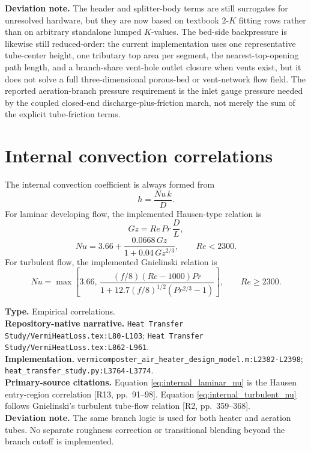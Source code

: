 \documentclass[11pt]{article}
\newcommand{\srcref}[1]{\nolinkurl{#1}}
\newcommand{\filepath}[1]{\nolinkurl{#1}}
\begin{document}
\textbf{Deviation note.} The header and splitter-body terms are still surrogates for unresolved hardware, but they are now based on textbook \(2\)-\(K\) fitting rows rather than on arbitrary standalone lumped \(K\)-values. The bed-side backpressure is likewise still reduced-order: the current implementation uses one representative tube-center height, one tributary top area per segment, the nearest-top-opening path length, and a branch-share vent-hole outlet closure when vents exist, but it does not solve a full three-dimensional porous-bed or vent-network flow field. The reported aeration-branch pressure requirement is the inlet gauge pressure needed by the coupled closed-end discharge-plus-friction march, not merely the sum of the explicit tube-friction terms.

\section{Internal convection correlations}
The internal convection coefficient is always formed from
\begin{equation}
\label{eq:internal_h}
h=\frac{Nu\,k}{D}.
\end{equation}
For laminar developing flow, the implemented Hausen-type relation is
\begin{equation}
\label{eq:graetz}
Gz=Re\,Pr\,\frac{D}{L},
\end{equation}
\begin{equation}
\label{eq:internal_laminar_nu}
Nu=3.66+\frac{0.0668\,Gz}{1+0.04\,Gz^{2/3}},
\qquad Re<2300.
\end{equation}
For turbulent flow, the implemented Gnielinski relation is
\begin{equation}
\label{eq:internal_turbulent_nu}
Nu=\max\!\left[
3.66,\,
\frac{(f/8)(Re-1000)Pr}{1+12.7(f/8)^{1/2}(Pr^{2/3}-1)}
\right],
\qquad Re\ge 2300.
\end{equation}

\textbf{Type.} Empirical correlations. \\
\textbf{Repository-native narrative.} \filepath{Heat Transfer Study/VermiHeatLoss.tex:L80-L103}; \filepath{Heat Transfer Study/VermiHeatLoss.tex:L862-L961}. \\
\textbf{Implementation.} \srcref{vermicomposter_air_heater_design_model.m:L2382-L2398}; \srcref{heat_transfer_study.py:L3764-L3774}. \\
\textbf{Primary-source citations.} Equation \eqref{eq:internal_laminar_nu} is the Hausen entry-region correlation [R13, pp.~91--98]. Equation \eqref{eq:internal_turbulent_nu} follows Gnielinski's turbulent tube-flow relation [R2, pp.~359--368]. \\
\textbf{Deviation note.} The same branch logic is used for both heater and aeration tubes. No separate roughness correction or transitional blending beyond the branch cutoff is implemented.
\end{document}
